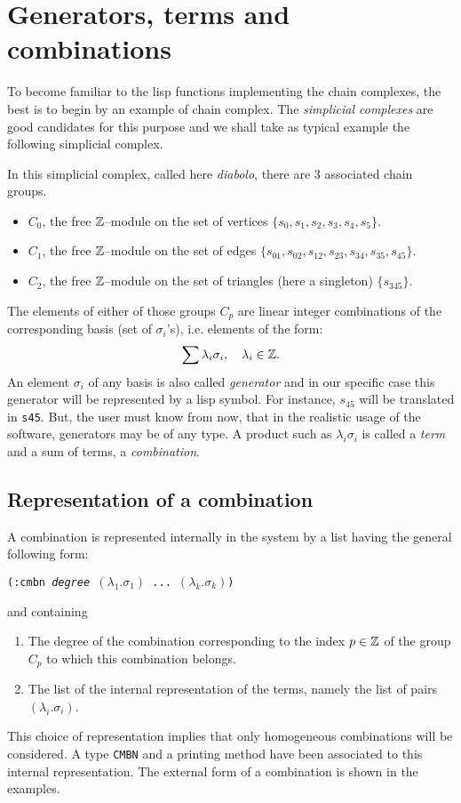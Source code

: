 \section {Generators, terms and combinations}

To become familiar to the lisp functions implementing the chain complexes, the best is to begin
by an example of chain complex. The {\em simplicial complexes} are good candidates
for this purpose and we shall take as typical example the following simplicial
complex.
%
\vskip 0.50cm
\centerline{}
\vskip 0.50cm
%
In this simplicial complex, called here {\em diabolo}, there are $3$ associated chain groups.
\begin{itemize}
\item $C_0$, the free ${\Bbb Z}$--module on the set of vertices $\{s_0,s_1,s_2,s_3,s_4,s_5 \}$.
\item $C_1$, the free ${\Bbb Z}$--module on the set of  edges 
   $\{ s_{01}, s_{02}, s_{12}, s_{23}, s_{34}, s_{35}, s_{45} \}$.
\item $C_2$, the free ${\Bbb Z}$--module on the set of  triangles (here a singleton)
   $\{ s_{345} \}$.
\end{itemize}
The elements of either of those groups $C_p$ are linear integer combinations  of the
corresponding basis (set of $\sigma_i$'s), i.e. elements of the form:
$$ \sum {\lambda_i \sigma_i}, \quad \lambda_i \in {\Bbb Z}. $$
An element $\sigma_i$ of any basis is also called {\em generator} and in our specific case
this generator will be represented by a  lisp symbol. For instance,
$s_{45}$ will be translated in {\tt s45}. But, the user must know from now, that in the realistic
usage of the software, generators may be of any type.
A product such as $\lambda_i \sigma_i$ is called
a {\em term} and a sum of terms, a {\em combination}.

\subsection {Representation of a combination}

A combination is represented internally in the system by a  list 
having the general following form:
\begin{center}
{\tt (:cmbn {\em degree} $(\lambda_1.\sigma_1)$ ... $(\lambda_k.\sigma_k)$)}
\end{center}
and containing
\begin{enumerate}
\item The degree of the combination  corresponding to the index $p \in {\Bbb Z}$  of the group 
$C_p$ to which this combination belongs.
\item The  list of the internal representation of the terms, namely the list of pairs $(\lambda_i.\sigma_i)$.
\end{enumerate}
This choice of representation implies that only homogeneous combinations
will be considered. A type {\tt CMBN} and 
a printing method have been associated to this internal representation. The external
form of a combination is shown in the  examples. 

